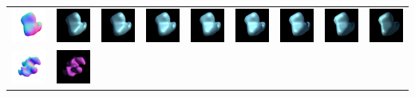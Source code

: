 \begin{center}
\begin{longtable}{@{}c@{}c@{}c@{}c@{}c@{}c@{}c@{}c@{}c@{}}
\includegraphics[width=0.1\linewidth]{training/2_gt.png} & \includegraphics[width=0.1\linewidth]{training/2_0.png} &
\includegraphics[width=0.1\linewidth]{training/2_1.png} & \includegraphics[width=0.1\linewidth]{training/2_2.png} &
\includegraphics[width=0.1\linewidth]{training/2_3.png} & \includegraphics[width=0.1\linewidth]{training/2_4.png} &
\includegraphics[width=0.1\linewidth]{training/2_5.png} & \includegraphics[width=0.1\linewidth]{training/2_6.png} &
\includegraphics[width=0.1\linewidth]{training/2_7.png} \\
\includegraphics[width=0.1\linewidth]{training/3_gt.png} & \includegraphics[width=0.1\linewidth]{training/3_0.png} &

\end{longtable}
\end{center}
